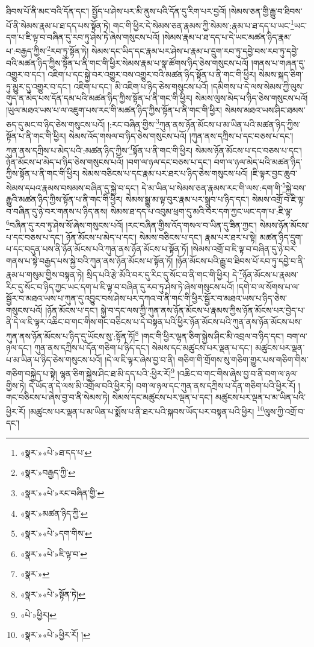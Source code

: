 ཐིབས་པོ་ནི་མང་བའི་དོན་དང་། སྤྱོད་པ་ཤེས་པར་མི་ནུས་པའི་དོན་དུ་རིག་པར་བྱའོ། །སེམས་ཅན་གྱི་རྒྱུ་བ་ཐིབས་པོ་ནི་སེམས་རྣམ་པ་ཐ་དད་པས་སྟོན་ཏེ། གང་གི་ཕྱིར་དེ་སེམས་ཅན་རྣམས་ཀྱི་སེམས་:རྣམ་པ་ཐ་དད་པ་ཡང་\footnote{«སྣར་»«པེ་»ཐ་དད་པ་}ཡང་དག་པ་ཇི་ལྟ་བ་བཞིན་དུ་རབ་ཏུ་ཤེས་ཏེ་ཞེས་གསུངས་པའོ། །སེམས་རྣམ་པ་ཐ་དད་པ་དེ་ཡང་མཚན་ཉིད་རྣམ་པ་:བརྒྱད་ཀྱིས་\footnote{«སྣར་»བརྒྱད་ཀྱི་}རབ་ཏུ་སྟོན་ཏེ། སེམས་དང་ཡིད་དང་རྣམ་པར་ཤེས་པ་རྣམ་པ་དྲུག་རབ་ཏུ་དབྱེ་བས་རབ་ཏུ་དབྱེ་བའི་མཚན་ཉིད་ཀྱིས་སྟོན་པ་ནི་གང་གི་ཕྱིར་སེམས་རྣམ་པ་སྣ་ཚོགས་ཉིད་ཅེས་གསུངས་པའོ། །གནས་པ་གཞན་དུ་འགྱུར་བ་དང་། འཇིག་པ་དང་སྐྱེ་བར་འགྱུར་བས་འགྱུར་བའི་མཚན་ཉིད་སྟོན་པ་ནི་གང་གི་ཕྱིར། སེམས་སྐད་ཅིག་ཏུ་མྱུར་དུ་འགྱུར་བ་དང་། འཇིག་པ་དང་། མི་འཇིག་པ་ཉིད་ཅེས་གསུངས་པའོ། །དམིགས་པ་དེ་ལས་སེམས་ཀྱི་ལུས་གུད་ན་མེད་པས་དོན་དམ་པའི་མཚན་ཉིད་ཀྱིས་སྟོན་པ་ནི་གང་གི་ཕྱིར། སེམས་ལུས་མེད་པ་ཉིད་ཅེས་གསུངས་པའོ། །ཡུལ་མཐའ་ཡས་པ་ལ་འཇུག་པས་རང་གི་མཚན་ཉིད་ཀྱིས་སྟོན་པ་ནི་གང་གི་ཕྱིར། སེམས་མཐའ་ཡས་ཤིང་ཐམས་ཅད་དུ་མང་བ་ཉིད་ཅེས་གསུངས་པའོ། །:རང་བཞིན་གྱིས་\footnote{«སྣར་»«པེ་»རང་བཞིན་གྱི་}ཀུན་ནས་ཉོན་མོངས་པ་མ་ཡིན་པའི་མཚན་ཉིད་ཀྱིས་སྟོན་པ་ནི་གང་གི་ཕྱིར། སེམས་འོད་གསལ་བ་ཉིད་ཅེས་གསུངས་པའོ། །ཀུན་ནས་དཀྲིས་པ་དང་བཅས་པ་དང་། ཀུན་ནས་དཀྲིས་པ་མེད་པའི་:མཚན་ཉིད་ཀྱིས་\footnote{«སྣར་»མཚན་ཉིད་ཀྱི་}སྟོན་པ་ནི་གང་གི་ཕྱིར། སེམས་ཉོན་མོངས་པ་དང་བཅས་པ་དང་། ཉོན་མོངས་པ་མེད་པ་ཉིད་ཅེས་གསུངས་པའོ། །བག་ལ་ཉལ་དང་བཅས་པ་དང་། བག་ལ་ཉལ་མེད་པའི་མཚན་ཉིད་ཀྱིས་སྟོན་པ་ནི་གང་གི་ཕྱིར། སེམས་བཅིངས་པ་དང་རྣམ་པར་ཐར་པ་ཉིད་ཅེས་གསུངས་པའོ། །ཇི་ལྟར་བྱང་ཆུབ་སེམས་དཔའ་རྣམས་བསམས་བཞིན་དུ་སྐྱེ་བ་དང་། དེ་མ་ཡིན་པ་སེམས་ཅན་རྣམས་རང་གི་ལས་:དག་གི་\footnote{«སྣར་»«པེ་»དག་གིས་}སྐྱེ་བས་རྒྱུའི་མཚན་ཉིད་ཀྱིས་སྟོན་པ་ནི་གང་གི་ཕྱིར། སེམས་སྒྱུ་མ་ལྟ་བུར་རྣམ་པར་སྒྲུབ་པ་ཉིད་དང་། སེམས་འགྲོ་བ་ཇི་ལྟ་བ་བཞིན་དུ་ཉེ་བར་གནས་པ་ཉིད་ནས། སེམས་ཐ་དད་པ་འབུམ་ཕྲག་དུ་མའི་བར་དག་ཀྱང་ཡང་དག་པ་:ཇི་ལྟ་\footnote{«སྣར་»«པེ་»ཇི་ལྟ་བ་}བཞིན་དུ་རབ་ཏུ་ཤེས་སོ་ཞེས་གསུངས་པའོ། །རང་བཞིན་གྱིས་འོད་གསལ་བ་ཡིན་དུ་ཟིན་ཀྱང་། སེམས་ཉོན་མོངས་པ་དང་བཅས་པ་དང་། ཉོན་མོངས་པ་མེད་པ་དང་། སེམས་བཅིངས་པ་དང་། རྣམ་པར་ཐར་པ་སྟེ། མཚན་ཉིད་དྲུག་པ་དང་བདུན་པས་ནི་ཉོན་མོངས་པའི་ཀུན་ནས་ཉོན་མོངས་པ་སྟོན་ཏོ། །སེམས་འགྲོ་བ་ཇི་ལྟ་བ་བཞིན་དུ་ཉེ་བར་གནས་པ་སྟེ་བརྒྱད་པས་སྐྱེ་བའི་ཀུན་ནས་ཉོན་མོངས་པ་སྟོན་ཏོ། །ཉོན་མོངས་པའི་རྒྱུ་བ་ཐིབས་པོ་རབ་ཏུ་དབྱེ་བ་ནི་རྣམ་པ་གསུམ་གྱིས་བསྟན་ཏེ། སྲིད་པའི་རྩེ་མོའི་བར་དུ་རིང་དུ་སོང་བ་ནི་གང་གི་ཕྱིར། དེ་\footnote{«སྣར་»}ཉོན་མོངས་པ་རྣམས་རིང་དུ་སོང་བ་ཉིད་ཀྱང་ཡང་དག་པ་ཇི་ལྟ་བ་བཞིན་དུ་རབ་ཏུ་ཤེས་ཏེ་ཞེས་གསུངས་པའོ། །དགེ་བ་ལ་སོགས་པ་ལ་སྦྱོར་བ་མཐའ་ཡས་པ་ཀུན་དུ་འབྱུང་བས་ཤེས་པར་དཀའ་བ་ནི་གང་གི་ཕྱིར་སྦྱོར་བ་མཐའ་ཡས་པ་ཉིད་ཅེས་གསུངས་པའོ། །ཉོན་མོངས་པ་དང་། སྐྱེ་བ་དང་ལས་ཀྱི་ཀུན་ནས་ཉོན་མོངས་པ་རྣམས་ཀྱིས་ཉོན་མོངས་པར་བྱེད་པ་ནི་དེ་ལ་ཇི་ལྟར་འཆིང་བ་གང་གིས་གང་བཅིངས་པ་དེ་བསྟན་པའི་ཕྱིར་ཉོན་མོངས་པའི་ཀུན་ནས་ཉོན་མོངས་པས་ཀུན་ནས་ཉོན་མོངས་པ་ཉིད་དུ་ཡོངས་སུ་:སྟོན་ཏོ།\footnote{«སྣར་»«པེ་»སྟོན་ཏེ།} །གང་གི་ཕྱིར་ལྷན་ཅིག་སྐྱེས་ཤིང་མི་འབྲལ་བ་ཉིད་དང་། བག་ལ་ཉལ་དང་། ཀུན་ནས་དཀྲིས་པ་དོན་གཅིག་པ་ཉིད་དང་། སེམས་དང་མཚུངས་པར་ལྡན་པ་དང་། མཚུངས་པར་ལྡན་པ་མ་ཡིན་པ་ཉིད་ཅེས་གསུངས་པའོ། །དེ་ལ་ཇི་ལྟར་ཞེས་བྱ་བ་ནི། གཅིག་གི་གྲོགས་སུ་གཅིག་གྱུར་པས་གཅིག་གིས་གཅིག་བསྐྱེད་པ་སྟེ། ལྷན་ཅིག་སྐྱེས་ཤིང་ཐ་མི་དད་པའི་:ཕྱིར་རོ།\footnote{«པེ་»ཕྱིར།} །འཆིང་བ་གང་གིས་ཞེས་བྱ་བ་ནི་བག་ལ་ཉལ་གྱིས་ཏེ། དེ་ཡོད་ན་དེ་ལས་མི་འགྲོལ་བའི་ཕྱིར་ཏེ། བག་ལ་ཉལ་དང་ཀུན་ནས་དཀྲིས་པ་དོན་གཅིག་པའི་ཕྱིར་རོ། །གང་བཅིངས་པ་ཞེས་བྱ་བ་ནི་སེམས་ཏེ། སེམས་དང་མཚུངས་པར་ལྡན་པ་དང་། མཚུངས་པར་ལྡན་པ་མ་ཡིན་པའི་ཕྱིར་རོ། །མཚུངས་པར་ལྡན་པ་མ་ཡིན་པ་སྨོས་པ་ནི་ཐར་པའི་སྐབས་ཡོད་པར་བསྟན་པའི་ཕྱིར། \footnote{«སྣར་»«པེ་»ཕྱིར་རོ། ། }ལུས་ཀྱི་འགྲོ་བ་དང་། 